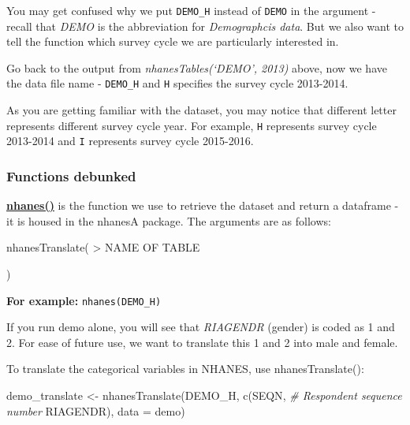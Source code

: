 \documentclass[
]{book}
\newenvironment{Shaded}{\begin{snugshade}}{\end{snugshade}}
\newcommand{\AttributeTok}[1]{\textcolor[rgb]{0.77,0.63,0.00}{#1}}
\newcommand{\CommentTok}[1]{\textcolor[rgb]{0.56,0.35,0.01}{\textit{#1}}}
\newcommand{\FunctionTok}[1]{\textcolor[rgb]{0.00,0.00,0.00}{#1}}
\newcommand{\NormalTok}[1]{#1}
\newcommand{\OtherTok}[1]{\textcolor[rgb]{0.56,0.35,0.01}{#1}}
\newcommand{\StringTok}[1]{\textcolor[rgb]{0.31,0.60,0.02}{#1}}
\begin{document}
You may get confused why we put \texttt{DEMO\_H} instead of \texttt{DEMO} in the argument - recall that \emph{DEMO} is the abbreviation for \emph{Demographcis data}. But we also want to tell the function which survey cycle we are particularly interested in.

Go back to the output from \emph{nhanesTables(`DEMO', 2013)} above, now we have the data file name - \texttt{DEMO\_H} and \texttt{H} specifies the survey cycle 2013-2014.

As you are getting familiar with the dataset, you may notice that different letter represents different survey cycle year. For example, \texttt{H} represents survey cycle 2013-2014 and \texttt{I} represents survey cycle 2015-2016.

\hypertarget{functions-debunked-8}{%
\subsubsection{Functions debunked}\label{functions-debunked-8}}

\href{https://www.rdocumentation.org/packages/nhanesA/versions/0.6.5.3/topics/nhanes}{\textbf{nhanes()}} is the function we use to retrieve the dataset and return a dataframe - it is housed in the nhanesA package. The arguments are as follows:

nhanesTranslate(
\textgreater{} NAME OF TABLE

)

\textbf{For example:} \texttt{nhanes(\textquotesingle{}DEMO\_H\textquotesingle{})}

If you run demo alone, you will see that \emph{RIAGENDR} (gender) is coded as 1 and 2. For ease of future use, we want to translate this 1 and 2 into male and female.

To translate the categorical variables in NHANES, use nhanesTranslate():

\begin{Shaded}
\begin{Highlighting}[]
\NormalTok{demo\_translate }\OtherTok{\textless{}{-}} \FunctionTok{nhanesTranslate}\NormalTok{(}\StringTok{\textquotesingle{}DEMO\_H\textquotesingle{}}\NormalTok{,}
                                  \FunctionTok{c}\NormalTok{(}\StringTok{\textquotesingle{}SEQN\textquotesingle{}}\NormalTok{, }\CommentTok{\# Respondent sequence number}
                                    \StringTok{\textquotesingle{}RIAGENDR\textquotesingle{}}\NormalTok{), }
                                 \AttributeTok{data =}\NormalTok{ demo)}
\end{Highlighting}
\end{Shaded}
\end{document}
